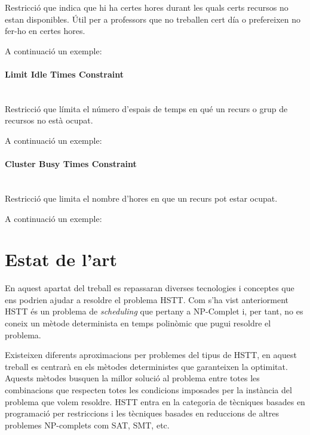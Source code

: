 \documentclass[11pt,a4paper,twoside]{report}
\begin{document}
  Restricció que indica que hi ha certes hores durant les quals certs recursos no estan disponibles. Útil per a professors que no treballen cert día o prefereixen no fer-ho en certes hores.
  
  A continuació un exemple:

  
  
  \paragraph*{Limit Idle Times Constraint} ~\\

  Restricció que límita el número d'espais de temps en qué un recurs o grup de recursos no està ocupat. 

  A continuació un exemple:

  
  \paragraph*{Cluster Busy Times Constraint} ~\\

  Restricció que limita el nombre d'hores en que un recurs pot estar ocupat.

  A continuació un exemple:

  


  

  \section{Estat de l'art}

  En aquest apartat del treball es repassaran diverses tecnologies i conceptes que ens podrien ajudar a resoldre el problema HSTT. 
  Com s'ha vist anteriorment HSTT és un problema de \textit{scheduling} que pertany a NP-Complet i, per tant, no es coneix un mètode determinista en temps polinòmic que pugui resoldre el problema. 

  Existeixen diferents aproximacions per problemes del tipus de HSTT, en aquest treball es centrarà en els mètodes deterministes que garanteixen la optimitat. Aquests mètodes busquen la millor solució al problema entre totes les combinacions 
  que respecten totes les condicions imposades per la instància del problema que volem resoldre. HSTT entra en la categoria de tècniques basades en programació per restriccions i les tècniques basades en reduccions de altres problemes NP-complets com SAT, SMT, etc.
\end{document}
